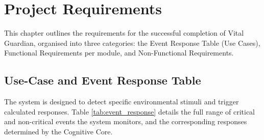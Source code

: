 \chapter{Project Requirements}
\label{chap:requirements}

This chapter outlines the requirements for the successful completion of Vital
Guardian, organised into three categories: the Event Response Table (Use Cases),
Functional Requirements per module, and Non-Functional Requirements.

\section{Use-Case and Event Response Table}
\label{sec:event_response}

The system is designed to detect specific environmental stimuli and trigger
calculated responses. Table \ref{tab:event_response} details the full range of
critical and non-critical events the system monitors, and the corresponding
responses determined by the Cognitive Core.

